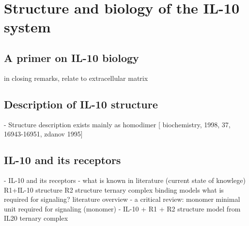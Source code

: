 \chapter{Structure and biology of the IL-10 system}

\section{A primer on IL-10 biology}

        in closing remarks, relate to extracellular matrix

\section{Description of IL-10 structure}

    - Structure description
        exists mainly as homodimer [
            biochemistry, 1998, 37, 16943-16951, zdanov 1995]

\section{IL-10 and its receptors}

    - IL-10 and its receptors
        - what is known in literature (current state of knowlege)
            R1+IL-10 structure
            R2 structure
            ternary complex binding models
            what is required for signaling? literature overview
        - a critical review: monomer
            minimal unit required for signaling (monomer)
        - IL-10 + R1 + R2 structure model from IL20 ternary complex


\lipsum[1-5]